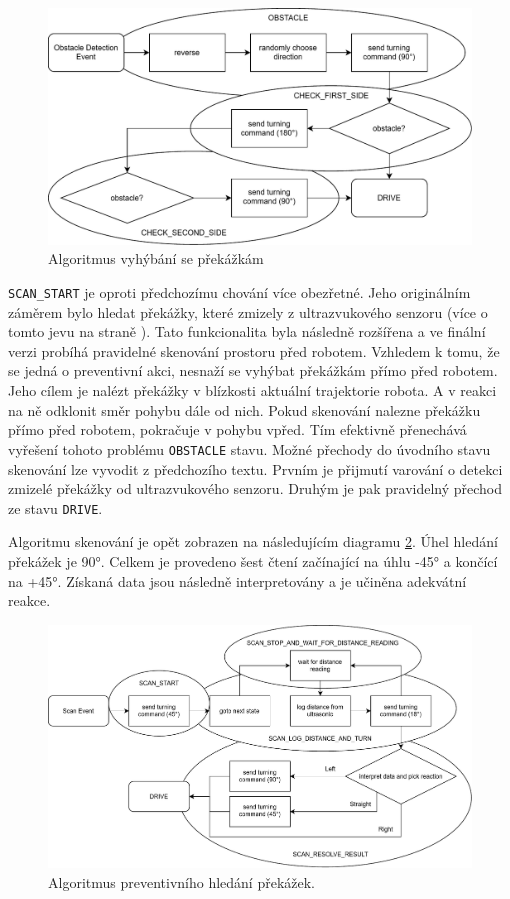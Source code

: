 \begin{figure}[h!]
	\centering
	\includegraphics[scale=0.75]{obrazky-figures/wandering_obstacle_diagram.pdf}
	\caption{Algoritmus vyhýbání se překážkám}
	\label{fig:alg_obstacle}
\end{figure}

\verb|SCAN_START| je oproti předchozímu chování více obezřetné. Jeho originálním záměrem bylo hledat překážky, které zmizely z ultrazvukového senzoru (více o tomto jevu na straně \pageref{implementation:ultrasonic}). Tato funkcionalita byla následně rozšířena a ve finální verzi probíhá pravidelné skenování prostoru před robotem. Vzhledem k tomu, že se jedná o preventivní akci, nesnaží se vyhýbat překážkám přímo před robotem. Jeho cílem je nalézt překážky v blízkosti aktuální trajektorie robota. A v reakci na ně odklonit směr pohybu dále od nich. Pokud skenování nalezne překážku přímo před robotem, pokračuje v pohybu vpřed. Tím efektivně přenechává vyřešení tohoto problému \verb|OBSTACLE| stavu. Možné přechody do úvodního stavu skenování lze vyvodit z předchozího textu. Prvním je přijmutí varování o detekci zmizelé překážky od ultrazvukového senzoru. Druhým je pak pravidelný přechod ze stavu \verb|DRIVE|.

Algoritmu skenování je opět zobrazen na následujícím diagramu \ref{fig:alg_scan}. Úhel hledání překážek je 90°. Celkem je provedeno šest čtení začínající na úhlu -45° a končící na +45°. Získaná data jsou následně interpretovány a je učiněna adekvátní reakce.

\begin{figure}[h!]
	\centering
	\includegraphics[scale=0.65]{obrazky-figures/wandering_scan_diagram.pdf}
	\caption{Algoritmus preventivního hledání překážek.}
	\label{fig:alg_scan}
\end{figure}

